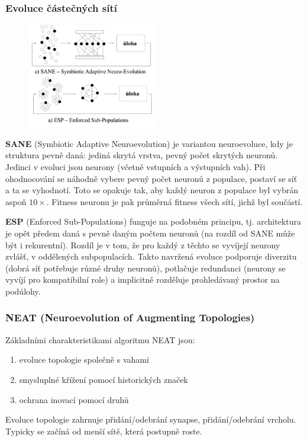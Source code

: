 \subsubsection{Evoluce částečných sítí}
\setlength\intextsep{0pt}
\begin{figure}
	\includegraphics[width=0.5\textwidth]{img/sane_esp.png}
\end{figure}
\textbf{SANE} (Symbiotic Adaptive Neuroevolution) je variantou neuroevoluce, kdy je struktura pevně daná: jediná skrytá vrstva, pevný počet skrytých neuronů. Jedinci v evoluci jsou neurony (včetně vstupních a výstupních vah). Při ohodnocování se náhodně vybere pevný počet neuronů z populace, postaví se síť a ta se vyhodnotí. Toto se opakuje tak, aby každý neuron z populace byl vybrán aspoň $10\times$. Fitness neuronu je pak průměrná fitness všech sítí, jichž byl součástí.

\textbf{ESP} (Enforced Sub-Populations) funguje na podobném principu, tj. architektura je opět předem daná s pevně daným počtem neuronů (na rozdíl od SANE může být i rekurentní). Rozdíl je v tom, že pro každý z těchto  se vyvíjejí neurony zvlášť, v oddělených subpopulacích. Takto navržená evoluce podporuje diverzitu (dobrá síť potřebuje různé druhy neuronů), potlačuje redundanci (neurony se vyvíjí pro kompatibilní role) a implicitně rozděluje prohledávaný prostor na podúlohy.


\subsubsection{NEAT (Neuroevolution of Augmenting Topologies)}
Základními charakteristikami algoritmu NEAT jsou: 
\begin{enumerate}
	
	
	\item evoluce topologie společně s vahami
	\item smysluplné křížení pomocí historických značek
	\item ochrana inovací pomocí druhů
\end{enumerate}
Evoluce topologie zahrnuje přidání/odebrání synapse, přidání/odebrání vrcholu. Typicky se začíná od menší sítě, která postupně roste.

